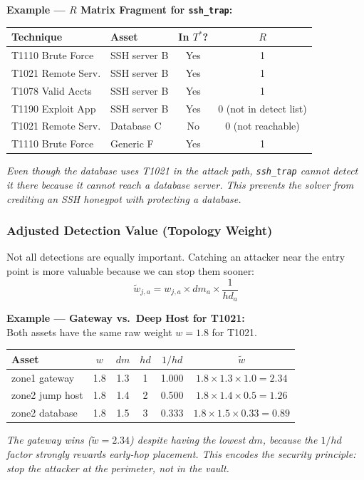 \documentclass[journal]{IEEEtran}
\newcommand{\tildeW}{\tilde{w}}
\begin{document}
\begin{examplebox}
\textbf{Example --- $R$ Matrix Fragment for
\texttt{ssh\_trap}:}
\begin{center}
\small
\renewcommand{\arraystretch}{1.1}
\begin{tabular}{@{}llcc@{}}
\toprule
\textbf{Technique} & \textbf{Asset} & \textbf{In $T^*$?} &
$R$ \\
\midrule
T1110 Brute Force  & SSH server B    & Yes & 1 \\
T1021 Remote Serv. & SSH server B    & Yes & 1 \\
T1078 Valid Accts  & SSH server B    & Yes & 1 \\
T1190 Exploit App  & SSH server B    & Yes & 0 (not in detect list) \\
T1021 Remote Serv. & Database C      & No  & 0 (not reachable) \\
T1110 Brute Force  & Generic F       & Yes & 1 \\
\bottomrule
\end{tabular}
\end{center}
\textit{Even though the database uses T1021 in the attack
path, \texttt{ssh\_trap} cannot detect it there because
it cannot reach a database server.
This prevents the solver from crediting an SSH honeypot
with protecting a database.}
\end{examplebox}

\subsubsection{Adjusted Detection Value (Topology Weight)}

Not all detections are equally important.
Catching an attacker near the entry point is more valuable
because we can stop them sooner:
\begin{equation}
  \tildeW_{j,a} = w_{j,a} \times dm_a \times \frac{1}{hd_a}
\end{equation}

\begin{examplebox}
\textbf{Example --- Gateway vs.\ Deep Host for T1021:}\\[3pt]
Both assets have the same raw weight $w=1.8$ for T1021.
\begin{center}
\small
\renewcommand{\arraystretch}{1.1}
\begin{tabular}{@{}lccccc@{}}
\toprule
\textbf{Asset} & $w$ & $dm$ & $hd$ & $1/hd$ &
$\tildeW$ \\
\midrule
zone1 gateway    & 1.8 & 1.3 & 1 & 1.000 &
  $1.8\times1.3\times1.0=\mathbf{2.34}$ \\
zone2 jump host  & 1.8 & 1.4 & 2 & 0.500 &
  $1.8\times1.4\times0.5=\mathbf{1.26}$ \\
zone2 database   & 1.8 & 1.5 & 3 & 0.333 &
  $1.8\times1.5\times0.33=\mathbf{0.89}$ \\
\bottomrule
\end{tabular}
\end{center}
\textit{The gateway wins ($\tildeW=2.34$) despite having the
lowest $dm$, because the $1/hd$ factor strongly rewards
early-hop placement.
This encodes the security principle:
\emph{stop the attacker at the perimeter, not in the vault}.}
\end{examplebox}
\end{document}
